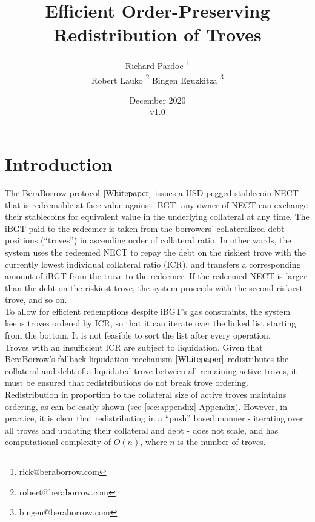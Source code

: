 \documentclass[reqno]{article}
\begin{document}
\title{\textbf{Efficient Order-Preserving Redistribution of Troves}}
\author{Richard Pardoe \thanks{rick@beraborrow.com}\\[1ex]
  Robert Lauko \thanks{robert@beraborrow.com} \hspace{2cm}
  Bingen Eguzkitza \thanks{bingen@beraborrow.com}
}
\date{December 2020\\v1.0}
\maketitle

\tableofcontents

\section{Introduction}


The BeraBorrow protocol $\cite{Whitepaper}$ issues a USD-pegged stablecoin NECT that is redeemable at face value against iBGT: any owner of NECT can exchange their stablecoins for equivalent value in the underlying collateral at any time. The iBGT paid to the redeemer is taken from the borrowers' collateralized debt positions (“troves”) in ascending order of collateral ratio. In other words, the system uses the redeemed NECT to repay the debt on the riskiest trove with the currently lowest individual collateral ratio (ICR), and transfers a corresponding amount of iBGT from the trove to the redeemer. If the redeemed NECT is larger than the debt on the riskiest trove, the system proceeds with the second riskiest trove, and so on. \\

To allow for efficient redemptions despite iBGT's gas constraints, the system keeps troves ordered by ICR, so that it can iterate over the linked list starting from the bottom. It is not feasible to sort the list after every operation. \\

Troves with an insufficient ICR are subject to liquidation. Given that BeraBorrow's fallback liquidation mechanism $\cite{Whitepaper}$ redistributes the collateral and debt of a liquidated trove between all remaining active troves, it must be ensured that redistributions do not break trove ordering. \\

Redistribution in proportion to the collateral size of active troves maintains ordering, as can be easily shown (see \ref{sec:appendix} Appendix). However, in practice, it is clear that redistributing in a “push” based manner - iterating over all troves and updating their collateral and debt - does not scale, and has computational complexity of $O(n)$, where $n$ is the number of troves. \\
\end{document}
